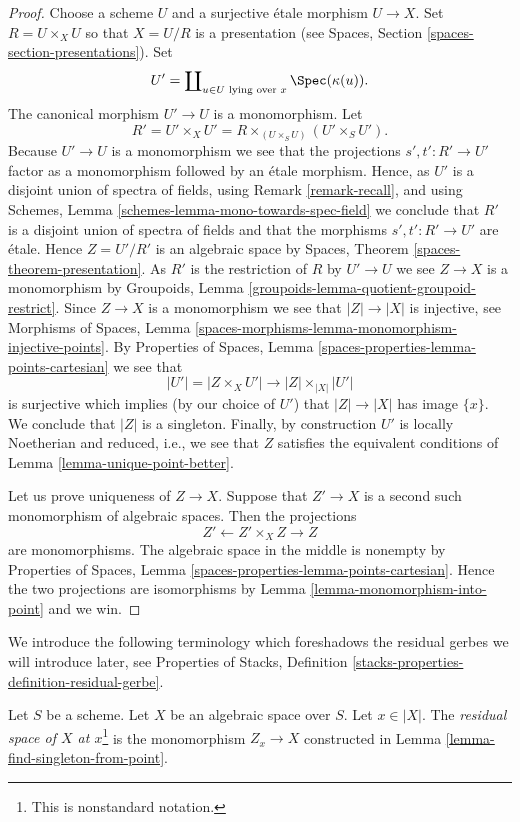 \begin{proof}
Choose a scheme $U$ and a surjective \'etale morphism $U \to X$.
Set $R = U \times_X U$ so that $X = U/R$ is a presentation (see
Spaces, Section \ref{spaces-section-presentations}).
Set
$$
U' = \coprod\nolimits_{u \in U\text{ lying over }x} \Spec(\kappa(u)).
$$
The canonical morphism $U' \to U$ is a monomorphism. Let
$$
R' = U' \times_X U' = R \times_{(U \times_S U)} (U' \times_S U').
$$
Because $U' \to U$ is a monomorphism we see that the projections
$s', t' : R' \to U'$ factor as a monomorphism followed by an
\'etale morphism. Hence, as $U'$ is a disjoint union of spectra
of fields, using
Remark \ref{remark-recall},
and using
Schemes, Lemma \ref{schemes-lemma-mono-towards-spec-field}
we conclude that $R'$ is a disjoint union of spectra of fields and
that the morphisms $s', t' : R' \to U'$ are \'etale. Hence
$Z = U'/R'$ is an algebraic space by
Spaces, Theorem \ref{spaces-theorem-presentation}.
As $R'$ is the restriction of $R$ by $U' \to U$ we see
$Z \to X$ is a monomorphism by
Groupoids, Lemma \ref{groupoids-lemma-quotient-groupoid-restrict}.
Since $Z \to X$ is a monomorphism we see that $|Z| \to |X|$ is injective, see
Morphisms of Spaces, Lemma
\ref{spaces-morphisms-lemma-monomorphism-injective-points}.
By
Properties of Spaces, Lemma \ref{spaces-properties-lemma-points-cartesian}
we see that
$$
|U'| = |Z \times_X U'| \to |Z| \times_{|X|} |U'|
$$
is surjective which implies (by our choice of $U'$) that
$|Z| \to |X|$ has image $\{x\}$. We conclude that $|Z|$ is a singleton.
Finally, by construction $U'$ is locally Noetherian and reduced, i.e.,
we see that $Z$ satisfies the equivalent conditions of
Lemma \ref{lemma-unique-point-better}.

\medskip\noindent
Let us prove uniqueness of $Z \to X$. Suppose that
$Z' \to X$ is a second such monomorphism of algebraic spaces.
Then the projections
$$
Z' \longleftarrow Z' \times_X Z \longrightarrow Z
$$
are monomorphisms. The algebraic space in the middle is nonempty by
Properties of Spaces,
Lemma \ref{spaces-properties-lemma-points-cartesian}.
Hence the two projections are isomorphisms by
Lemma \ref{lemma-monomorphism-into-point}
and we win.
\end{proof}

\noindent
We introduce the following terminology which foreshadows
the residual gerbes we will introduce later, see
Properties of Stacks, Definition
\ref{stacks-properties-definition-residual-gerbe}.

\begin{definition}
\label{definition-residual-space}
Let $S$ be a scheme.
Let $X$ be an algebraic space over $S$. Let $x \in |X|$.
The
{\it residual space of $X$ at $x$}\footnote{This is nonstandard notation.}
is the monomorphism $Z_x \to X$ constructed in
Lemma \ref{lemma-find-singleton-from-point}.
\end{definition}

